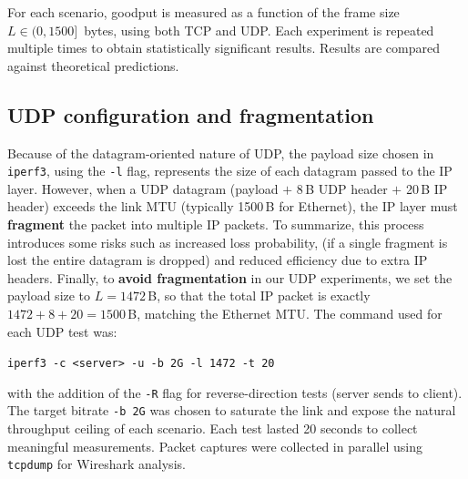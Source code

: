 For each scenario, goodput is measured as a function of the frame size $L \in (0, 1500]$~bytes, using both TCP and UDP. Each experiment is repeated multiple times to obtain statistically significant results. Results are compared against theoretical predictions.
\subsection{UDP configuration and fragmentation}
Because of the datagram-oriented nature of UDP, the payload size chosen in \texttt{iperf3}, using the \texttt{-l} flag, represents the size of each datagram passed to the IP layer. 
However, when a UDP datagram (payload $+$ 8\,B UDP header $+$ 20\,B IP header) exceeds the link MTU (typically 1500\,B for Ethernet), the IP layer must \textbf{fragment} the packet into multiple IP packets. To summarize, this process introduces some risks such as increased loss probability, (if a single fragment is lost the entire datagram is dropped) and reduced efficiency due to extra IP headers.
Finally, to \textbf{avoid fragmentation} in our UDP experiments, we set the payload size to $L = 1472$\,B, so that the total IP packet is exactly $1472 + 8 + 20 = 1500$\,B, matching the Ethernet MTU. The command used for each UDP test was:
\begin{center}
\texttt{iperf3 -c <server> -u -b 2G -l 1472 -t 20}
\end{center}
with the addition of the \texttt{-R} flag for reverse-direction tests (server sends to client). The target bitrate \texttt{-b~2G} was chosen to saturate the link and expose the natural throughput ceiling of each scenario. 
Each test lasted 20 seconds to collect meaningful measurements. Packet captures were collected in parallel using \texttt{tcpdump} for Wireshark analysis.